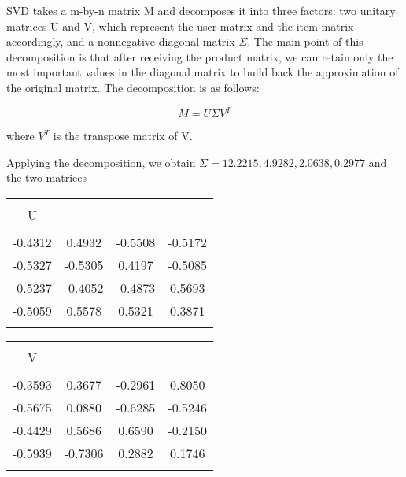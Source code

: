 SVD takes a m-by-n matrix M and decomposes it into three factors: two unitary matrices U and V, which represent the user matrix and the item matrix accordingly, and a nonnegative diagonal matrix \(\Sigma \). The main point of this decomposition is that after receiving the product matrix, we can retain only the most important values in the diagonal matrix to build back the approximation of the original matrix. The decomposition is as follows:

\begin{displaymath}
M = U \Sigma V^T
\end{displaymath}

where \(V^T\) is the transpose matrix of V. 

Applying the decomposition, we obtain \(\Sigma = {12.2215, 4.9282, 2.0638, 0.2977} \) and the two matrices

\hfill \break

\begin{minipage}[t]{0.5\textwidth}

\begin{tabular}{c c c c}
\hline\hline \\
U \\
\hline \\
-0.4312 & 0.4932 & -0.5508 & -0.5172 \\
-0.5327 & -0.5305 & 0.4197 & -0.5085 \\
-0.5237 & -0.4052 & -0.4873 & 0.5693 \\
-0.5059 & 0.5578 & 0.5321 & 0.3871 \\
\hline\hline \\
\end{tabular}

\end{minipage}\hfill
\begin{minipage}[t]{0.5\textwidth}
\begin{tabular}{c c c c}
\hline\hline \\
V \\
\hline \\
-0.3593 & 0.3677 & -0.2961 & 0.8050 \\
-0.5675 & 0.0880 & -0.6285 & -0.5246 \\
-0.4429 & 0.5686 & 0.6590 & -0.2150 \\
-0.5939 & -0.7306 & 0.2882 & 0.1746 \\
\hline\hline \\
\end{tabular}
\end{minipage}%


